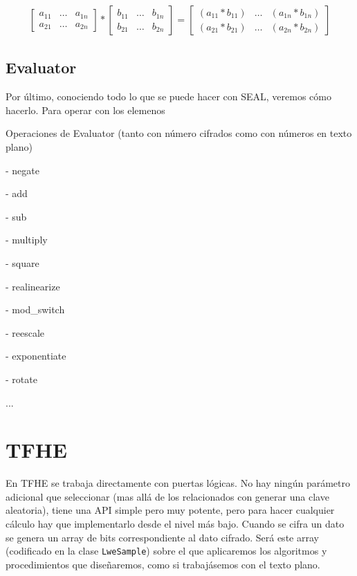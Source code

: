 \begin{gather}
    \begin{bmatrix}
        a_{11}  & \hdots    & a_{1n} \\
        a_{21}  & \hdots    & a_{2n}
    \end{bmatrix}
    *
    \begin{bmatrix}
        b_{11}  & \hdots    & b_{1n} \\
        b_{21}  & \hdots    & b_{2n}
    \end{bmatrix} 
    =
    \begin{bmatrix}
        (a_{11} * b_{11})    & \hdots    & (a_{1n} * b_{1n}) \\
        (a_{21} * b_{21})    & \hdots    & (a_{2n} * b_{2n})
    \end{bmatrix}
\end{gather}



\subsection{Evaluator}

Por último, conociendo todo lo que se puede hacer con SEAL, veremos cómo hacerlo. Para operar con los elemenos 

Operaciones de Evaluator (tanto con número cifrados como con números en texto plano)

- negate

- add

- sub

- multiply

- square

- realinearize

- mod\_switch

- reescale

- exponentiate

- rotate

...


\section{TFHE}

En TFHE se trabaja directamente con puertas lógicas. No hay ningún parámetro adicional que seleccionar (mas allá de los relacionados con generar una clave aleatoria), tiene una API simple pero muy potente, pero para hacer cualquier cálculo hay que implementarlo desde el nivel más bajo. Cuando se cifra un dato se genera un array de bits correspondiente al dato cifrado. Será este array (codificado en la clase \verb|LweSample|) sobre el que aplicaremos los algoritmos y procedimientos que diseñaremos, como si trabajásemos con el texto plano.

